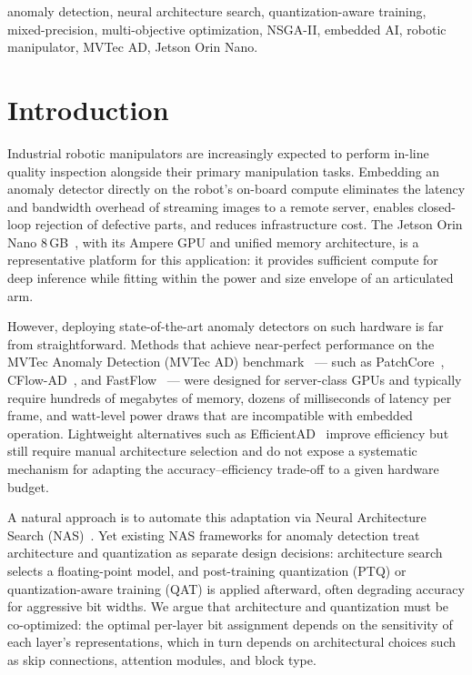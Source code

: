 \documentclass[journal]{IEEEtran}
\begin{document}
\begin{IEEEkeywords}
anomaly detection, neural architecture search, quantization-aware training,
mixed-precision, multi-objective optimization, NSGA-II, embedded AI,
robotic manipulator, MVTec AD, Jetson Orin Nano.
\end{IEEEkeywords}

\section{Introduction}
\label{sec:intro}

Industrial robotic manipulators are increasingly expected to perform in-line
quality inspection alongside their primary manipulation tasks.
Embedding an anomaly detector directly on the robot's on-board compute
eliminates the latency and bandwidth overhead of streaming images to a remote
server, enables closed-loop rejection of defective parts, and reduces
infrastructure cost.
The Jetson Orin Nano 8\,GB~\cite{nvidia2023jetson}, with its Ampere GPU
and unified memory architecture, is a representative platform for this
application: it provides sufficient compute for deep inference while fitting
within the power and size envelope of an articulated arm.

However, deploying state-of-the-art anomaly detectors on such hardware is
far from straightforward.
Methods that achieve near-perfect performance on the MVTec Anomaly Detection
(MVTec AD) benchmark~\cite{bergmann2019mvtec} — such as
PatchCore~\cite{roth2022towards}, CFlow-AD~\cite{gudovskiy2022cflow}, and
FastFlow~\cite{yu2021fastflow} — were designed for server-class GPUs and
typically require hundreds of megabytes of memory, dozens of milliseconds of
latency per frame, and watt-level power draws that are incompatible with
embedded operation.
Lightweight alternatives such as
EfficientAD~\cite{batzner2024efficientad} improve efficiency but still require
manual architecture selection and do not expose a systematic mechanism for
adapting the accuracy--efficiency trade-off to a given hardware budget.

A natural approach is to automate this adaptation via Neural Architecture Search
(NAS)~\cite{elsken2019neural,white2023neural}.
Yet existing NAS frameworks for anomaly detection treat architecture and
quantization as separate design decisions: architecture search selects a
floating-point model, and post-training quantization (PTQ) or
quantization-aware training (QAT) is applied afterward, often degrading
accuracy for aggressive bit widths.
We argue that architecture and quantization must be co-optimized: the optimal
per-layer bit assignment depends on the sensitivity of each layer's
representations, which in turn depends on architectural choices such as skip
connections, attention modules, and block type.
\end{document}
